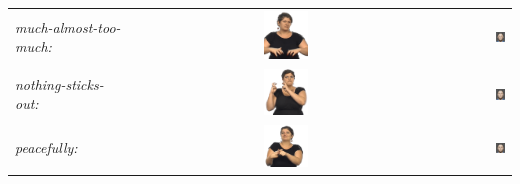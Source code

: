 \documentclass[../../main]{subfiles}
\begin{document}
\begin{longtable}{|l|c|r|}
    \emph{much-almost-too-much:} & \includegraphics[width=0.15\textwidth]{chapters/facial_expressions/images/original_facial_expressions/much_almost_too_much.png} & \includegraphics[width=0.15\textwidth]{chapters/facial_expressions/images/synthesized_expressions/much_almost_too_much.png} \\
    \emph{nothing-sticks-out:} & \includegraphics[width=0.15\textwidth]{chapters/facial_expressions/images/original_facial_expressions/nothing_sticks_out.png} & \includegraphics[width=0.15\textwidth]{chapters/facial_expressions/images/synthesized_expressions/nothing_sticks_out.png} \\
    \emph{peacefully:} & \includegraphics[width=0.15\textwidth]{chapters/facial_expressions/images/original_facial_expressions/peacefully.png} & \includegraphics[width=0.15\textwidth]{chapters/facial_expressions/images/synthesized_expressions/peacefully.png} \\

\end{longtable}
\end{document}
